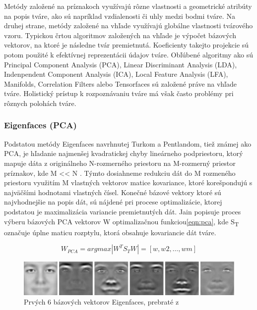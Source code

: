 Metódy založené na príznakoch využívajú rôzne vlastnosti a geometrické atribúty na popis tváre, ako sú napríklad vzdialenosti či uhly medzi bodmi tváre.
Na druhej strane, metódy založené na vhľade využívajú globálne vlastnosti tvárového vzoru.
Typickou črtou algoritmov založených na vhľade je výpočet bázových vektorov, na ktoré je následne tvár premietnutá.
Koeficienty takejto projekcie sú potom použité k efektívnej reprezentácii údajov tváre\cite{handbookbio}.
Obľúbené algoritmy ako sú Principal Component Analysis (PCA), Linear Discriminant Analysis (LDA), Indenpendent Component Analysis (ICA),
Local Feature Analysis (LFA), Manifolds, Correlation Filters alebo Tensorfaces sú založené práve na vhľade tváre.
Holistický prístup k rozpoznávaniu tváre má však často problémy pri rôznych polohách tváre\cite{handbookbio}.

\subsubsection{Eigenfaces (PCA)}
Podstatou metódy Eigenfaces navrhnutej Turkom a Pentlandom\cite{turk1991eigenfaces}, tiež známej ako PCA,
je hľadanie najmenšej kvadratickej chyby lineárneho podpriestoru,
ktorý mapuje dáta z originálneho N-rozmerného priestoru na M-rozmerný priestor príznakov, kde M << N .
Týmto dosiahneme redukciu dát do M rozmeného priestoru využitím M vlastných vektorov matice kovariance, ktoré korešpondujú s najväčšími hodnotami vlastných čísel\cite{handbookbio}.
Konečné bázové vektory ktoré sú najvhodnejšie na popis dát, sú nájdené pri procese optimalizácie, ktorej podstatou je  maximalizácia variancie premietnutých dát.
Jain popisuje\cite{handbookbio} proces výberu bázových PCA vektorov W optimalizačnou funkciou\eqref{eqn:pca}, kde S\textsubscript{T} označuje úplne maticu rozptylu,
ktorá obsahuje kovariancie dát tváre.


\begin{equation}\label{eqn:pca}
    W_{PCA} = arg max|W^T S_T W| = [w, w2,\dots,wm]
\end{equation}

\begin{figure}[H]
    \centering
    \includegraphics[width=1\linewidth]{img/eigenfaces}
    \caption{Prvých 6 bázových vektorov Eigenfaces, prebraté z\cite[p.~45]{handbookbio}}
    \label{fig:eigenfaces}
\end{figure}

